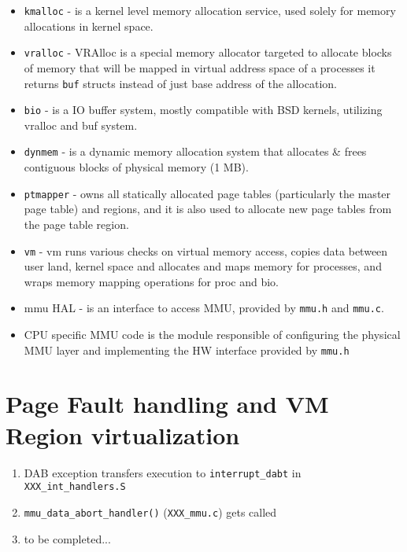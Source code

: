 \begin{itemize}
  \item \verb+kmalloc+  - is a kernel level memory allocation service, used
                        solely for memory allocations in kernel space.
  \item \verb+vralloc+  - VRAlloc is a special memory allocator targeted to
                        allocate blocks of memory that will be mapped in virtual
                        address space of a processes it returns \verb+buf+
                        structs instead of just base address of the allocation.
  \item \verb+bio+      - is a IO buffer system, mostly compatible with BSD
                        kernels, utilizing vralloc and buf system.
  \item \verb+dynmem+   - is a dynamic memory allocation system that allocates
                        \& frees contiguous blocks of physical memory (1 MB).
  \item \verb+ptmapper+ - owns all statically allocated page tables
                        (particularly the master page table) and regions,
                        and it is also used to allocate new page tables from
                        the page table region.
  \item \verb+vm+       - vm runs various checks on virtual memory access,
                        copies data between user land, kernel space and
                        allocates and maps memory for processes, and wraps
                        memory mapping operations for proc and \acs{bio}.
  \item mmu HAL -       is an interface to access MMU, provided by \verb+mmu.h+
                        and \verb+mmu.c+.
  \item CPU specific MMU code is the module responsible of configuring the
        physical MMU layer and implementing the HW interface provided by
        \verb+mmu.h+
\end{itemize}


\section{Page Fault handling and VM Region virtualization}

\begin{enumerate}
\item DAB exception transfers execution to \verb+interrupt_dabt+ in \verb+XXX_int_handlers.S+
\item \verb+mmu_data_abort_handler()+ (\verb+XXX_mmu.c+) gets called
\item to be completed...
\end{enumerate}
